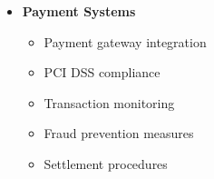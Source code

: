 \begin{tcolorbox}[
    colback=white,
    colframe=primarydark,
    title=\textbf{NITDA and Consumer Protection Requirements},
    before skip=1em,
    after skip=1em
]
\begin{itemize}[leftmargin=*,itemsep=0.5em]
        \item \textbf{Payment Systems}
        \begin{itemize}[itemsep=0.3em]
            \item Payment gateway integration
            \item PCI DSS compliance
            \item Transaction monitoring
            \item Fraud prevention measures
            \item Settlement procedures
        \end{itemize}
    \end{itemize}
\end{tcolorbox}

